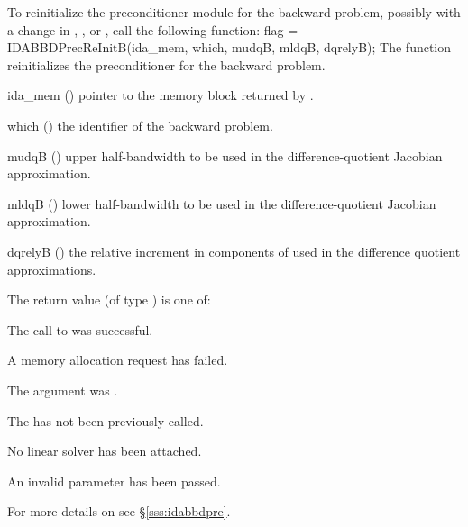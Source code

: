 {}
To reinitialize the {\idabbdpre} preconditioner module for the backward problem,
possibly with a change in , , or , call the
following function:
{
  flag = IDABBDPrecReInitB(ida\_mem, which, mudqB, mldqB, dqrelyB);
}
{
  The function  reinitializes the {\idabbdpre} preconditioner
  for the backward problem.
}
{
  \begin{args}
  \item[ida\_mem] ()
    pointer to the {\idas} memory block returned by .
  \item[which] ()
    the identifier of the backward problem.
  \item[mudqB] ()
    upper half-bandwidth to be used in the difference-quotient Jacobian approximation.
  \item[mldqB] ()
    lower half-bandwidth to be used in the difference-quotient Jacobian approximation.
  \item[dqrelyB] ()
    the relative increment in components of  used in the difference quotient
    approximations.
  \end{args}
}
{
  The return value  (of type ) is one of:
  \begin{args}
  \item[\Id{IDASPILS\_SUCCESS}]
    The call to  was successful.
  \item[\Id{IDASPILS\_MEM\_FAIL}]
    A memory allocation request has failed.
  \item[\Id{IDASPILS\_MEM\_NULL}]
    The  argument was .
  \item[\Id{IDASPILS\_PMEM\_NULL}]
    The  has not been previously called.
  \item[\Id{IDASPILS\_LMEM\_NULL}]
    No linear solver has been attached.
  \item[\Id{IDASPILS\_ILL\_INPUT}]
    An invalid parameter has been passed.
  \end{args}
}
{}
For more details on {\idabbdpre} see \S\ref{sss:idabbdpre}.

